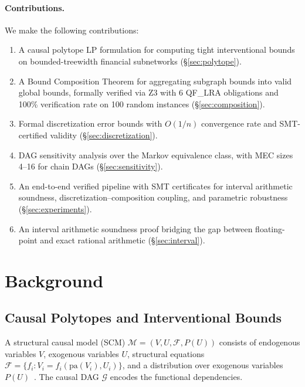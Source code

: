 \documentclass[11pt,a4paper]{article}
\newcommand{\calG}{\mathcal{G}}
\newcommand{\calM}{\mathcal{M}}
\newcommand{\pa}{\mathrm{pa}}
\begin{document}
\paragraph{Contributions.} We make the following contributions:
\begin{enumerate}[nosep]
\item A causal polytope LP formulation for computing tight interventional bounds on bounded-treewidth financial subnetworks (\S\ref{sec:polytope}).
\item A Bound Composition Theorem for aggregating subgraph bounds into valid global bounds, formally verified via Z3 with 6 QF\_LRA obligations and 100\% verification rate on 100 random instances (\S\ref{sec:composition}).
\item Formal discretization error bounds with $O(1/n)$ convergence rate and SMT-certified validity (\S\ref{sec:discretization}).
\item DAG sensitivity analysis over the Markov equivalence class, with MEC sizes 4--16 for chain DAGs (\S\ref{sec:sensitivity}).
\item An end-to-end verified pipeline with SMT certificates for interval arithmetic soundness, discretization--composition coupling, and parametric robustness (\S\ref{sec:experiments}).
\item An interval arithmetic soundness proof bridging the gap between floating-point and exact rational arithmetic (\S\ref{sec:interval}).
\end{enumerate}

\section{Background}
\label{sec:background}

\subsection{Causal Polytopes and Interventional Bounds}
\label{sec:bg-polytope}

A structural causal model (SCM) $\calM = (V, U, \mathcal{F}, P(U))$ consists of endogenous variables $V$, exogenous variables $U$, structural equations $\mathcal{F} = \{f_i : V_i = f_i(\pa(V_i), U_i)\}$, and a distribution over exogenous variables $P(U)$~\citep{pearl2009causality}. The causal DAG $\calG$ encodes the functional dependencies.
\end{document}
